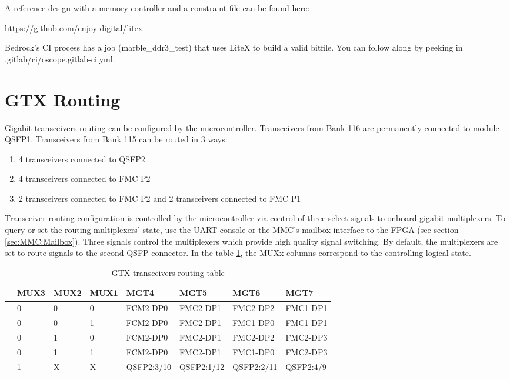 \documentclass[12pt,oneside,a4]{article}
\begin{document}
A reference design with a memory controller and a constraint file can be found here:
\begin{leftbar}
\url{https://github.com/enjoy-digital/litex}
\end{leftbar}
Bedrock's CI process has a job (marble\_ddr3\_test) that uses LiteX to build a valid bitfile.
You can follow along by peeking in .gitlab/ci/oscope.gitlab-ci.yml.

\section{GTX Routing}
Gigabit transceivers routing can be configured by the microcontroller. Transceivers from Bank 116 are permanently connected to module QSFP1. Transceivers from Bank 115 can be routed in 3 ways:
\begin{enumerate}
    \item 4 transceivers connected to QSFP2
    \item 4 transceivers connected to FMC P2
    \item 2 transceivers connected to FMC P2 and 2 transceivers connected to FMC P1
\end{enumerate}

Transceiver routing configuration is controlled by the microcontroller via control of three select signals to onboard gigabit multiplexers.
To query or set the routing multiplexers' state, use the UART console or the MMC's mailbox interface to the FPGA (see section \ref{sec:MMC:Mailbox}).
Three signals control the multiplexers which provide high quality signal switching.
By default, the multiplexers are set to route signals to the second QSFP connector.
In the table \ref{tab:gtx_routing}, the MUXx columns correspond to the controlling logical state.

\begin{table}[htbp]
\begin{tabular}{@{}llllllll@{}}
\toprule
 & MUX3 & MUX2 & MUX1 & MGT4       & MGT5       & MGT6       & MGT7      \\ \midrule
 & 0    & 0    & 0    & FCM2-DP0   & FMC2-DP1   & FMC2-DP2   & FMC1-DP1  \\
 & 0    & 0    & 1    & FCM2-DP0   & FMC2-DP1   & FMC1-DP0   & FMC1-DP1  \\
 & 0    & 1    & 0    & FCM2-DP0   & FMC2-DP1   & FMC2-DP2   & FMC2-DP3  \\
 & 0    & 1    & 1    & FCM2-DP0   & FMC2-DP1   & FMC1-DP0   & FMC2-DP3  \\
 & 1    & X    & X    & QSFP2:3/10 & QSFP2:1/12 & QSFP2:2/11 & QSFP2:4/9 \\ \bottomrule
\end{tabular}
\caption{GTX transceivers routing table}\label{tab:gtx_routing}
\end{table}
\end{document}
